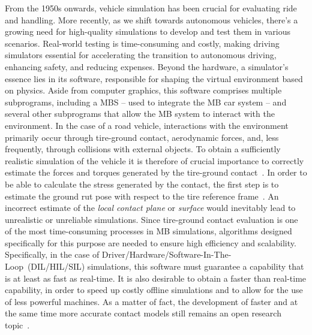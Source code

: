 From the 1950s onwards, vehicle simulation has been crucial for evaluating ride and handling. More recently, as we shift towards autonomous vehicles, there's a growing need for high-quality simulations to develop and test them in various scenarios. Real-world testing is time-consuming and costly, making driving simulators essential for accelerating the transition to autonomous driving, enhancing safety, and reducing expenses. Beyond the hardware, a simulator's essence lies in its software, responsible for shaping the virtual environment based on physics. Aside from computer graphics, this software comprises multiple subprograms, including a \ac{MBS} -- used to integrate the \ac{MB} car system -- and several other subprograms that allow the MB system to interact with the environment. In the case of a road vehicle, interactions with the environment primarily occur through tire-ground contact, aerodynamic forces, and, less frequently, through collisions with external objects. To obtain a sufficiently realistic simulation of the vehicle it is therefore of crucial importance to correctly estimate the forces and torques generated by the tire-ground contact~\cite{pacejka2012tire}. In order to be able to calculate the stress generated by the contact, the first step is to estimate the ground rut pose with respect to the tire reference frame~\cite{pacejka2005spin}. An incorrect estimate of the \emph{local contact plane} or \emph{surface} would inevitably lead to unrealistic or unreliable simulations. Since tire-ground contact evaluation is one of the most time-consuming processes in MB simulations, algorithms designed specifically for this purpose are needed to ensure high efficiency and scalability. Specifically, in the case of Driver/Hardware/Software-In-The-Loop~(DIL/HIL/SIL) simulations, this software must guarantee a capability that is at least as fast as real-time. It is also desirable to obtain a faster than real-time capability, in order to speed up costly offline simulations and to allow for the use of less powerful machines.  As a matter of fact, the development of faster and at the same time more accurate contact models still remains an open research topic~\cite{gallrein2014advanced, serban2023realtime}.

